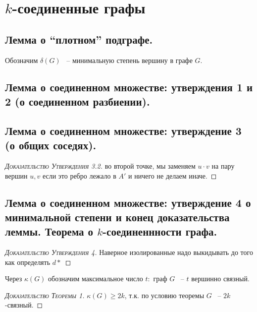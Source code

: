 \newpage

\section{$k$-соединенные графы}

\subsection{Лемма о “плотном” подграфе.}

\begin{df*}
	Обозначим $\delta(G)$ ~-- минимальную степень вершину в графе  $G$.
\end{df*}

\subsection{Лемма о соединенном множестве: утверждения 1 и 2 (о соединенном разбиении).}
\subsection{Лемма о соединенном множестве: утверждение 3 (о общих соседях).}

\begin{proof}[\normalfont\textsc{Доказательство Утверждения 3.2}]
	во второй точке, мы заменяем $u \cdot v$ на пару вершин  $u, v$ если это ребро лежало в  $A'$ и ничего не делаем иначе.
\end{proof}

\subsection{Лемма о соединенном множестве: утверждение 4 о минимальной степени и конец доказательства леммы. Теорема о $k$-соединеннности графа.}


\begin{proof}[\normalfont\textsc{Доказательство Утверждения 4}]
	Наверное изолированные надо выкидывать до того как определять $d*$
\end{proof}

\begin{df*}
	Через $\kappa(G)$ обозначим максимальное число $t\colon$ граф  $G$ ~-- $t$ вершинно связный.
\end{df*}

\begin{proof}[\normalfont\textsc{Доказательство Теоремы 1}]
	$\kappa(G) \geq 2k$, т.к. по условию теоремы  $G$ ~-- $2k$-связный.
\end{proof}


